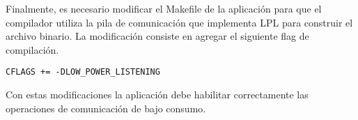 Finalmente, es necesario modificar el Makefile de la aplicación para que el compilador utiliza la pila de comunicación que implementa LPL para construir el archivo binario. La modificación consiste en agregar el siguiente flag de compilación.
\begin{center}
\begin{verbatim}
CFLAGS += -DLOW_POWER_LISTENING
\end{verbatim}
\end{center}

Con estas modificaciones la aplicación debe habilitar correctamente las operaciones de comunicación de bajo consumo.

